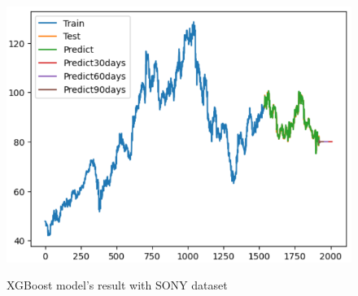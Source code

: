 \documentclass[conference]{IEEEtran}
\begin{document}
\begin{figure}[H]
\begin{minipage}{0.15\textwidth}
    \label{fig:2}
    \end{minipage}%
    \begin{minipage}{0.15\textwidth}
    \centering
    \includegraphics[width=1\textwidth]{Image/XGBoost/XGBoost_SONY_8_2.png}

    \label{fig:3}
    \end{minipage}
    \caption{ XGBoost model's result with SONY dataset }
\end{figure}
\end{document}
